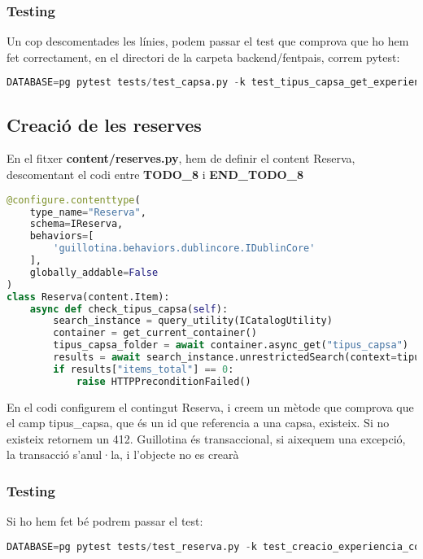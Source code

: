 \documentclass[a4paper, 11pt]{article}
\begin{document}
\subsubsection{Testing}
Un cop descomentades les línies, podem passar el test que comprova
  que ho hem fet correctament, en el directori de la carpeta
  backend/fentpais, correm pytest:
\begin{lstlisting}[language=Python, caption=Testing 4]
  DATABASE=pg pytest tests/test_capsa.py -k test_tipus_capsa_get_experiencies_endpoint
\end{lstlisting}

\subsection{Creació de les reserves}
En el fitxer \textbf{content/reserves.py}, hem de definir el content Reserva, descomentant el codi entre
\textbf{TODO\_8} i \textbf{END\_TODO\_8}

\begin{lstlisting}[language=Python, caption=Definició content type Reserva]
@configure.contenttype(
    type_name="Reserva",
    schema=IReserva,
    behaviors=[
        'guillotina.behaviors.dublincore.IDublinCore'
    ],
    globally_addable=False
)
class Reserva(content.Item):
    async def check_tipus_capsa(self):
        search_instance = query_utility(ICatalogUtility)
        container = get_current_container()
        tipus_capsa_folder = await container.async_get("tipus_capsa")
        results = await search_instance.unrestrictedSearch(context=tipus_capsa_folder, query={"id": self.tipus_capsa})
        if results["items_total"] == 0:
            raise HTTPPreconditionFailed()
\end{lstlisting}
En el codi configurem el contingut Reserva, i creem un mètode que
comprova que el camp tipus\_capsa, que és un id que referencia a una
capsa, existeix. Si no existeix retornem un 412. Guillotina és
transaccional, si aixequem una excepció, la transacció s'anul·la, i
l'objecte no es crearà

\subsubsection{Testing}
Si ho hem fet bé podrem passar el test:
\begin{lstlisting}[language=Python, caption=Testing 5]
  DATABASE=pg pytest tests/test_reserva.py -k test_creacio_experiencia_correcte
\end{lstlisting}
\end{document}
